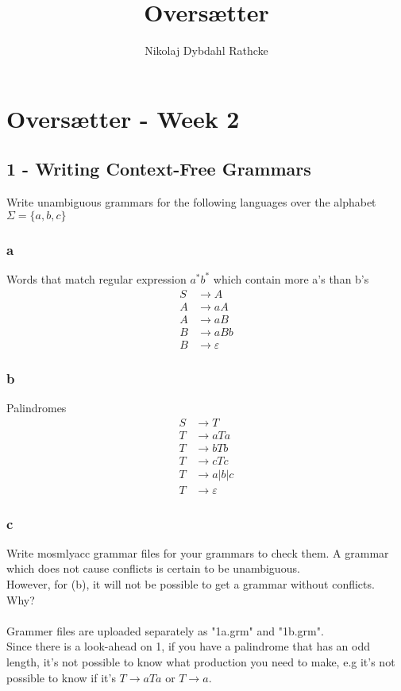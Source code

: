\documentclass[12pt]{article}
\title{Oversætter}
\author{Nikolaj Dybdahl Rathcke}
\begin{document}
\section*{Oversætter - Week 2}

\subsection*{1 - Writing Context-Free Grammars}
Write unambiguous grammars for the following languages over the alphabet $\Sigma = \{a, b, c\}$

\subsubsection*{a}
Words that match regular expression $a^*b^*$ which contain more a's than b's
\begin{align*}
S&\rightarrow A \\
A&\rightarrow aA \\
A&\rightarrow aB \\
B&\rightarrow aBb \\
B&\rightarrow \varepsilon
\end{align*}

\subsubsection*{b}
Palindromes
\begin{align*}
S&\rightarrow T \\
T&\rightarrow aTa \\
T&\rightarrow bTb \\
T&\rightarrow cTc \\
T&\rightarrow a|b|c \\
T&\rightarrow \varepsilon
\end{align*}

\subsubsection*{c}
Write mosmlyacc grammar files for your grammars to check them. A grammar which does not cause conflicts is certain to be unambiguous.\\
However, for (b), it will not be possible to get a grammar without conflicts. Why?\\
\\
Grammer files are uploaded separately as "1a.grm" and "1b.grm". \\
Since there is a look-ahead on 1, if you have a palindrome that has an odd length, it's not possible to know what production you need to make, e.g it's not possible to know if it's $T\rightarrow aTa$ or $T\rightarrow a$.
\end{document}
